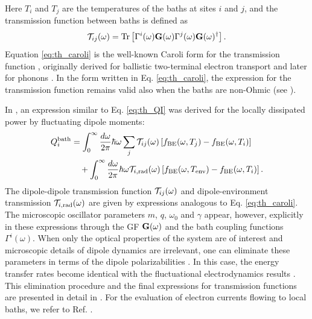 Here $T_i$ and $T_j$ are the temperatures of the baths at sites $i$ and $j$, and the transmission function between baths is defined as
\begin{equation}
 \mathcal{T}_{ij}(\omega) = \textrm{Tr}\left[\Gamma^i(\omega) \mathbf{G}(\omega) \Gamma^j(\omega) \mathbf{G}(\omega)^{\dagger} \right]. \label{eq:th_caroli}
\end{equation}
Equation \eqref{eq:th_caroli} is the well-known Caroli form for the transmission function \cite{caroli71}, originally derived for ballistic two-terminal electron transport and later for phonons \cite{mingo06,yamamoto06}. In the form written in Eq. \eqref{eq:th_caroli}, the expression for the transmission function remains valid also when the baths are non-Ohmic (see ). 

In , an expression similar to Eq. \eqref{eq:th_QI} was derived for the locally dissipated power by fluctuating dipole moments:
\begin{alignat}{2}
 Q_i^{\textrm{bath}} &= \int_0^{\infty}\frac{d\omega}{2\pi} \hbar\omega \sum_{j} \mathcal{T}_{ij}(\omega) \left[f_{\textrm{BE}}(\omega,T_j)-f_{\textrm{BE}}(\omega,T_i ) \right] \notag \\
  & \quad + \int_0^{\infty} \frac{d\omega}{2\pi} \hbar \omega \mathcal{T}_{i,\textrm{rad}}(\omega)\left[ f_{\textrm{BE}}(\omega,T_{\textrm{env}})-f_{\textrm{BE}}(\omega,T_i)\right].
\end{alignat}
The dipole-dipole transmission function $\mathcal{T}_{ij}(\omega)$ and dipole-environment transmission $\mathcal{T}_{i,\textrm{rad}}(\omega)$ are given by expressions analogous to Eq. \eqref{eq:th_caroli}. The microscopic oscillator parameters $m$, $q$, $\omega_0$ and $\gamma$ appear, however, explicitly in these expressions through the GF $\mathbf{G}(\omega)$ and the bath coupling functions $\Gamma^i(\omega)$. When only the optical properties of the system are of interest and microscopic details of dipole dynamics are irrelevant, one can eliminate these parameters in terms of the dipole polarizabilities \cite{rosa10,rosa11}. In this case, the energy transfer rates become identical with the fluctuational electrodynamics results \cite{benabdallah11,messina13}. This elimination procedure and the final expressions for transmission functions are presented in detail in . For the evaluation of electron currents flowing to local baths, we refer to Ref. \cite{roy07}.

